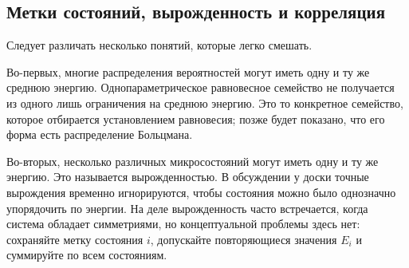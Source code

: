 \begin{classroomqa}
\end{classroomqa}

\begin{classroomqa}
\end{classroomqa}

\subsection{Метки состояний, вырожденность и корреляция}

Следует различать несколько понятий, которые легко смешать.

Во-первых, многие распределения вероятностей могут иметь одну и ту же среднюю энергию. Однопараметрическое равновесное семейство не получается из одного лишь ограничения на среднюю энергию. Это то конкретное семейство, которое отбирается установлением равновесия; позже будет показано, что его форма есть распределение Больцмана.

Во-вторых, несколько различных микросостояний могут иметь одну и ту же энергию. Это называется вырожденностью. В обсуждении у доски точные вырождения временно игнорируются, чтобы состояния можно было однозначно упорядочить по энергии. На деле вырожденность часто встречается, когда система обладает симметриями, но концептуальной проблемы здесь нет: сохраняйте метку состояния \(i\), допускайте повторяющиеся значения \(E_i\) и суммируйте по всем состояниям.

